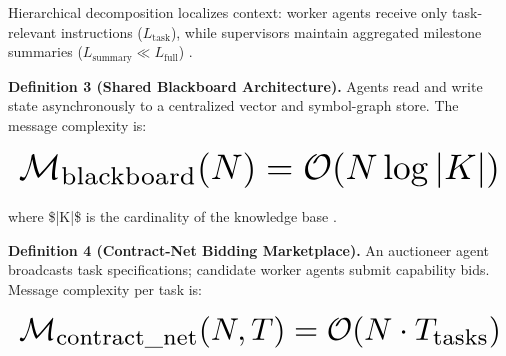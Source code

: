 \documentclass[11pt,a4paper]{article}
\begin{document}
Hierarchical decomposition localizes context: worker agents receive only task-relevant instructions ($L_{\text{task}}$), while supervisors maintain aggregated milestone summaries ($L_{\text{summary}} \ll L_{\text{full}}$) \cite{arxiv_2406_00584}.

\textbf{Definition 3 (Shared Blackboard Architecture).} Agents read and write state asynchronously to a centralized vector and symbol-graph store. The message complexity is:






















\begin{equation}
\resizebox{\columnwidth}{!}{$\displaystyle
\begin{aligned}
\mathcal{M}_{\text{blackboard}}(N) = \mathcal{O}(N \log |K|)
\end{aligned}
$}
\end{equation}






















where \$|K|\$ is the cardinality of the knowledge base \cite{crossref_10_1145_3689096_3689462}.

\textbf{Definition 4 (Contract-Net Bidding Marketplace).} An auctioneer agent broadcasts task specifications; candidate worker agents submit capability bids. Message complexity per task is:






















\begin{equation}
\resizebox{\columnwidth}{!}{$\displaystyle
\begin{aligned}
\mathcal{M}_{\text{contract\_net}}(N, T) = \mathcal{O}(N \cdot T_{\text{tasks}})
\end{aligned}
$}
\end{equation}
\end{document}
